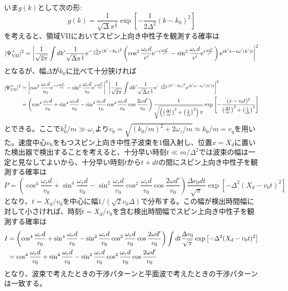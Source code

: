 いま$g(k)$として次の形:
\begin{equation}
g(k)=\frac{1}{\sqrt{\Delta} \pi^{\frac{1}{4}}} \exp \left[-\frac{1}{2\Delta^2}(k-k_0)^2\right]
\end{equation}
を考えると、領域VIIにおいてスピン上向き中性子を観測する確率は
\begin{equation}
|\Psi_\mathrm{VII}^+|^2=\left|\frac{1}{\sqrt{2\pi}}\int dk' \frac{1}{\sqrt{\Delta} \pi^{\frac{1}{4}}} \mathrm{e}^{ -\frac{1}{2\Delta^2}(k'-k_0)^2}\left( \cos^2 \frac{\omega_r d}{v'} \mathrm{e}^{-i\frac{\omega d'}{v'}} -\sin^2 \frac{\omega_r d}{v'} \mathrm{e}^{i\frac{\omega d'}{v'}} \right) \mathrm{e}^{i k'x-i\omega'(k')t} \right|^2
\end{equation}
となるが、幅$\Delta$が$k_0$に比べて十分狭ければ
\begin{align}
|\Psi_\mathrm{VII}^+|^2&\simeq \left| \cos^2 \frac{\omega_r d}{v_0} \mathrm{e}^{-i\frac{\omega d'}{v_0}} -\sin^2 \frac{\omega_r d}{v_0} \mathrm{e}^{i\frac{\omega d'}{v_0}} \right|^2 \left|\frac{1}{\sqrt{2\pi}}\int dk' \frac{1}{\sqrt{\Delta} \pi^{\frac{1}{4}}} \mathrm{e}^{ -\frac{1}{2\Delta^2}(k'-k_0)^2}\mathrm{e}^{i k'x-i\omega'(k')t} \right|^2 \notag \\
&=\left(\cos^4 \frac{\omega_r d}{v_0} +\sin^4 \frac{\omega_r d}{v_0}-\sin^2 \frac{\omega_r d}{v_0} \cos^2 \frac{\omega_r d}{v_0} \cos \frac{2\omega d'}{v_0} \right) \frac{1}{\sqrt{\left(\left(\frac{\Delta t}{m}\right)^2+\left(\frac{1}{\Delta}\right)^2\right)\pi}}\exp\left[-\frac{(x-v_0 t)^2}{\left(\frac{\Delta t}{m}\right)^2+\left(\frac{1}{\Delta}\right)^2}\right]
\end{align}
とできる。ここで$k_0^2/m \gg \omega_z$より$v_0=\sqrt{(k_0/m)^2+2\omega_z/m}\simeq k_0/m=v_g$を用いた。速度中心$v_0$をもつスピン上向き中性子波束を1個入射し、位置$x=X_d$に置いた検出器で検出することを考えると、十分早い時刻$t \ll m/\Delta^2$では波束の幅は一定と見なしてよいから、十分早い時刻$t$から$t+dt$の間にスピン上向き中性子を観測する確率は
\begin{equation}
P=\left(\cos^4 \frac{\omega_r d}{v_0} +\sin^4 \frac{\omega_r d}{v_0}-\sin^2 \frac{\omega_r d}{v_0} \cos^2 \frac{\omega_r d}{v_0} \cos \frac{2\omega d'}{v_0} \right) \frac{\Delta v_0dt}{\sqrt{\pi}}\exp\left[-\Delta^2(X_d-v_0 t)^2\right]
\end{equation}
となり、$t=X_d/v_0$を中心に幅$1/(\sqrt{2} v_0 \Delta)$で分布する。この幅が検出時間幅に対して小さければ、時刻$t=X_d/v_0$を含む検出時間幅でスピン上向き中性子を観測する確率は
\begin{align}
I&=\left(\cos^4 \frac{\omega_r d}{v_0} +\sin^4 \frac{\omega_r d}{v_0}-\sin^2 \frac{\omega_r d}{v_0} \cos^2 \frac{\omega_r d}{v_0} \cos \frac{2\omega d'}{v_0} \right) \int dt \frac{\Delta v_0}{\sqrt{\pi}}\exp\left[-\Delta^2(X_d-v_0 t)^2\right] \notag \\
&=\cos^4 \frac{\omega_r d}{v_0} +\sin^4 \frac{\omega_r d}{v_0}-\sin^2 \frac{\omega_r d}{v_0} \cos^2 \frac{\omega_r d}{v_0} \cos \frac{2\omega d'}{v_0}
\end{align}
となり、波束で考えたときの干渉パターンと平面波で考えたときの干渉パターンは一致する。

